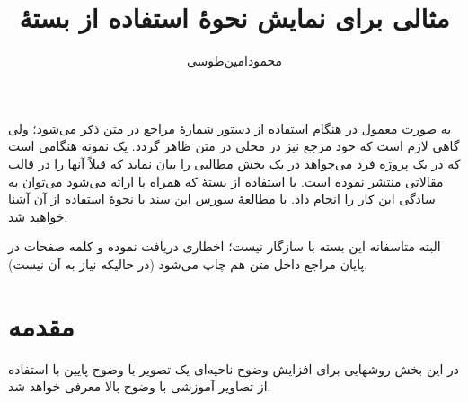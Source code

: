 \documentclass[11pt,a4paper]{article}
\title{مثالی برای نمایش نحوهٔ استفاده از بستهٔ \lr{bibentry}}
\author{محمودامین‌طوسی}\date{}
\begin{document}
\nobibliography*
\maketitle
به صورت معمول در هنگام استفاده از دستور  شمارهٔ مراجع در متن ذکر می‌شود؛ ولی گاهی لازم است که خود مرجع نیز در محلی در متن ظاهر گردد. یک نمونه هنگامی است که در یک پروژه فرد می‌خواهد در یک بخش مطالبی را بیان نماید که قبلاً آنها را در قالب مقالاتی منتشر نموده است. 
با استفاده از بستهٔ  که همراه با  ارائه می‌شود می‌توان به سادگی این کار را انجام داد.
با مطالعهٔ سورس این سند با نحوهٔ استفاده از آن آشنا خواهید شد. 

البته متاسفانه این بسته با  سازگار نیست؛ اخطاری دریافت نموده و کلمه صفحات در پایان مراجع داخل متن هم چاپ می‌شود (در حالیکه نیاز به آن نیست).

\section{مقدمه}

در این بخش روشهایی برای افزایش وضوح ناحیه‌ای یک تصویر با وضوح پایین با استفاده از تصاویر آموزشی با وضوح بالا معرفی خواهد شد.



\end{document}
